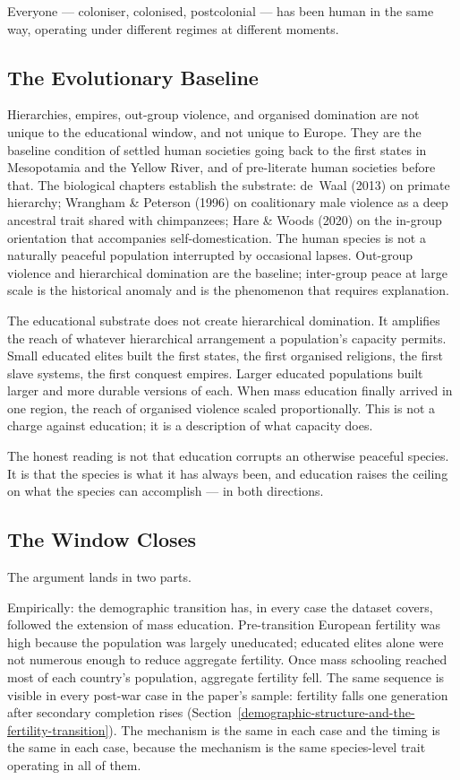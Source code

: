 \documentclass[12pt,letterpaper]{article}
\begin{document}
Everyone --- coloniser, colonised, postcolonial --- has been human in
the same way, operating under different regimes at different moments.

\subsection{The Evolutionary Baseline}\label{the-evolutionary-baseline}

Hierarchies, empires, out-group violence, and organised domination are
not unique to the educational window, and not unique to Europe. They
are the baseline condition of settled human societies going back to
the first states in Mesopotamia and the Yellow River, and of
pre-literate human societies before that. The biological chapters
establish the substrate: de~Waal (2013) on primate hierarchy; Wrangham
\& Peterson (1996) on coalitionary male violence as a deep ancestral
trait shared with chimpanzees; Hare \& Woods (2020) on the in-group
orientation that accompanies self-domestication. The human species is not a naturally peaceful
population interrupted by occasional lapses. Out-group violence and
hierarchical domination are the baseline; inter-group peace at large
scale is the historical anomaly and is the phenomenon that requires
explanation.

The educational substrate does not create hierarchical domination. It
amplifies the reach of whatever hierarchical arrangement a
population's capacity permits. Small educated elites built the first
states, the first organised religions, the first slave systems, the
first conquest empires. Larger educated populations built larger and
more durable versions of each. When mass education finally arrived in
one region, the reach of organised violence scaled proportionally.
This is not a charge against education; it is a description of what
capacity does.

The honest reading is not that education corrupts an otherwise
peaceful species. It is that the species is what it has always been,
and education raises the ceiling on what the species can accomplish
--- in both directions.

\subsection{The Window Closes}\label{the-window-closes}

The argument lands in two parts.

Empirically: the demographic transition has, in every case the dataset
covers, followed the extension of mass education. Pre-transition
European fertility was high because the population was largely
uneducated; educated elites alone were not numerous enough to reduce
aggregate fertility. Once mass schooling reached most of each
country's population, aggregate fertility fell. The same sequence is
visible in every post-war case in the paper's sample: fertility falls
one generation after secondary completion rises
(Section~\ref{demographic-structure-and-the-fertility-transition}).
The mechanism is the same in each case and the timing is the same in
each case, because the mechanism is the same species-level trait
operating in all of them.
\end{document}

